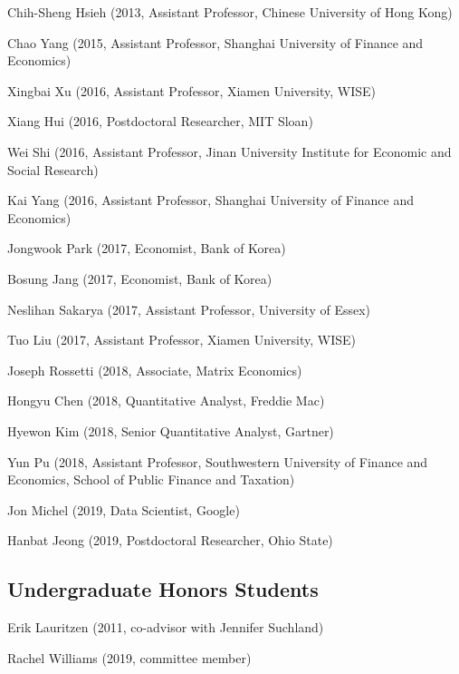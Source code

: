 \documentclass[10pt,letterpaper]{article}
\renewenvironment{itemize}{
  \begin{list}{}{
      \setlength{\leftmargin}{1.5em}
      \setlength{\itemsep}{0.25em}
      \setlength{\parskip}{0pt}
      \setlength{\parsep}{0.25em}
    }
}{
  \end{list}
}
\begin{document}
\begin{itemize}
\item Chih-Sheng Hsieh (2013, Assistant Professor, Chinese University of Hong Kong)
\item Chao Yang (2015, Assistant Professor, Shanghai University of Finance and Economics)
\item Xingbai Xu (2016, Assistant Professor, Xiamen University, WISE)
\item Xiang Hui (2016, Postdoctoral Researcher, MIT Sloan)
\item Wei Shi (2016, Assistant Professor, Jinan University Institute for Economic and Social Research)
\item Kai Yang (2016, Assistant Professor, Shanghai University of Finance and Economics)
\item Jongwook Park (2017, Economist, Bank of Korea)
\item Bosung Jang (2017, Economist, Bank of Korea)
\item Neslihan Sakarya (2017, Assistant Professor, University of Essex)
\item Tuo Liu (2017, Assistant Professor, Xiamen University, WISE)
\item Joseph Rossetti (2018, Associate, Matrix Economics)
\item Hongyu Chen (2018, Quantitative Analyst, Freddie Mac)
\item Hyewon Kim (2018, Senior Quantitative Analyst, Gartner)
\item Yun Pu (2018, Assistant Professor, Southwestern University of Finance and Economics, School of Public Finance and Taxation)
\item Jon Michel (2019, Data Scientist, Google)
\item Hanbat Jeong (2019, Postdoctoral Researcher, Ohio State)
\end{itemize}

\subsection*{Undergraduate Honors Students}

\begin{itemize}
\item Erik Lauritzen (2011, co-advisor with Jennifer Suchland)
\item Rachel Williams (2019, committee member)
\end{itemize}
\end{document}
